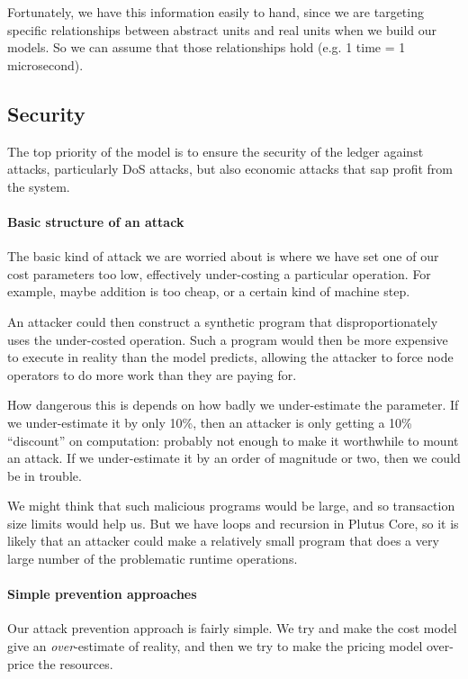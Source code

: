 Fortunately, we have this information easily to hand, since we are targeting specific relationships between abstract units and real units when we build our models.
So we can assume that those relationships hold (e.g. 1 \gls{time} = 1 microsecond).

\subsection{Security}
\label{sec:costing-security}

The top priority of the model is to ensure the security of the ledger against attacks, particularly DoS attacks, but also economic attacks that sap profit from the system.

\paragraph{Basic structure of an attack}
The basic kind of attack we are worried about is where we have set one of our cost parameters too low, effectively under-costing a particular operation.
For example, maybe addition is too cheap, or a certain kind of machine step.

An attacker could then construct a synthetic program that disproportionately uses the under-costed operation.
Such a program would then be more expensive to execute in reality than the model predicts, allowing the attacker to force node operators to do more work than they are paying for.

How dangerous this is depends on how badly we under-estimate the parameter.
If we under-estimate it by only 10\%, then an attacker is only getting a 10\% ``discount'' on computation: probably not enough to make it worthwhile to mount an attack.
If we under-estimate it by an order of magnitude or two, then we could be in trouble.

We might think that such malicious programs would be large, and so transaction size limits would help us.
But we have loops and recursion in Plutus Core, so it is likely that an attacker could make a relatively small program that does a very large number of the problematic runtime operations.

\paragraph{Simple prevention approaches}
Our attack prevention approach is fairly simple.
We try and make the cost model give an \emph{over}-estimate of reality, and then we try to make the pricing model over-price the resources.

